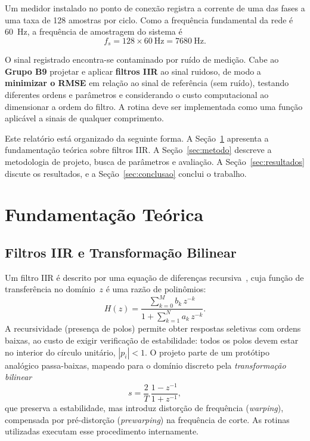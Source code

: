 \documentclass[conference]{IEEEtran}
\begin{document}
Um medidor instalado no ponto de conexão registra a corrente de uma das fases a
uma taxa de \num{128} amostras por ciclo. Como a frequência fundamental da rede
é \SI{60}{\hertz}, a frequência de amostragem do sistema é
\begin{equation}
f_s = 128 \times \SI{60}{\hertz} = \SI{7680}{\hertz}.
\end{equation}

O sinal registrado encontra-se contaminado por ruído de medição. Cabe ao
\textbf{Grupo B9} projetar e aplicar \textbf{filtros IIR} ao sinal ruidoso, de
modo a \textbf{minimizar o RMSE} em relação ao sinal de referência (sem ruído),
testando diferentes ordens e parâmetros e considerando o custo computacional ao
dimensionar a ordem do filtro. A rotina deve ser implementada como uma função
aplicável a sinais de qualquer comprimento.

Este relatório está organizado da seguinte forma. A
Seção~\ref{sec:teoria} apresenta a fundamentação teórica sobre filtros IIR. A
Seção~\ref{sec:metodo} descreve a metodologia de projeto, busca de parâmetros e
avaliação. A Seção~\ref{sec:resultados} discute os resultados, e a
Seção~\ref{sec:conclusao} conclui o trabalho.

\section{Fundamentação Teórica}
\label{sec:teoria}

\subsection{Filtros IIR e Transformação Bilinear}
Um filtro IIR é descrito por uma equação de diferenças recursiva~\cite{oppenheim},
cuja função de transferência no domínio~$z$ é uma razão de polinômios:
\begin{equation}
H(z) = \frac{\sum_{k=0}^{M} b_k\,z^{-k}}{1 + \sum_{k=1}^{N} a_k\,z^{-k}}.
\label{eq:Hz}
\end{equation}
A recursividade (presença de polos) permite obter respostas seletivas com ordens
baixas, ao custo de exigir verificação de estabilidade: todos os polos devem
estar no interior do círculo unitário, $|p_i| < 1$. O projeto parte de um
protótipo analógico passa-baixas, mapeado para o domínio discreto pela
\emph{transformação bilinear}
\begin{equation}
s = \frac{2}{T}\,\frac{1 - z^{-1}}{1 + z^{-1}},
\end{equation}
que preserva a estabilidade, mas introduz distorção de frequência
(\emph{warping}), compensada por pré-distorção (\emph{prewarping}) na frequência
de corte. As rotinas utilizadas executam esse procedimento internamente.
\end{document}
